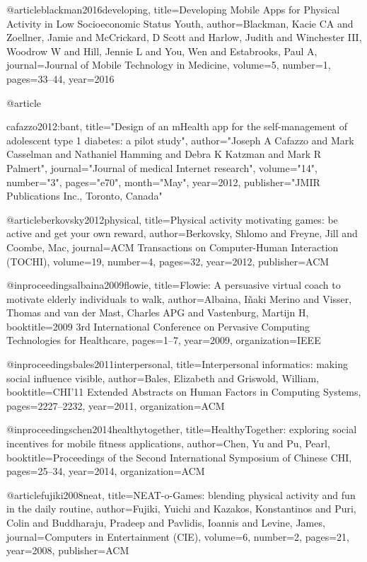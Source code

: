@article{blackman2016developing,
  title={Developing Mobile Apps for Physical Activity in Low Socioeconomic Status Youth},
  author={Blackman, Kacie CA and Zoellner, Jamie and McCrickard, D Scott and Harlow, Judith and Winchester III, Woodrow W and Hill, Jennie L and You, Wen and Estabrooks, Paul A},
  journal={Journal of Mobile Technology in Medicine},
  volume={5},
  number={1},
  pages={33--44},
  year={2016}
}


@article{cafazzo2012:bant,
  title="Design of an mHealth app for the self-management of adolescent type 1 diabetes: a pilot study",
  author="Joseph A Cafazzo and Mark Casselman and Nathaniel Hamming and Debra K Katzman  and Mark R Palmert",
  journal="Journal of medical Internet research",
  volume="14",
  number="3",
  pages="e70",
  month="May",
  year={2012},
  publisher="JMIR Publications Inc., Toronto, Canada"
  
}

@article{berkovsky2012physical,
  title={Physical activity motivating games: be active and get your own reward},
  author={Berkovsky, Shlomo and Freyne, Jill and Coombe, Mac},
  journal={ACM Transactions on Computer-Human Interaction (TOCHI)},
  volume={19},
  number={4},
  pages={32},
  year={2012},
  publisher={ACM}
}

@inproceedings{albaina2009flowie,
  title={Flowie: A persuasive virtual coach to motivate elderly individuals to walk},
  author={Albaina, I{\~n}aki Merino and Visser, Thomas and van der Mast, Charles APG and Vastenburg, Martijn H},
  booktitle={2009 3rd International Conference on Pervasive Computing Technologies for Healthcare},
  pages={1--7},
  year={2009},
  organization={IEEE}
}



@inproceedings{bales2011interpersonal,
  title={Interpersonal informatics: making social influence visible},
  author={Bales, Elizabeth and Griswold, William},
  booktitle={CHI'11 Extended Abstracts on Human Factors in Computing Systems},
  pages={2227--2232},
  year={2011},
  organization={ACM}
}

@inproceedings{chen2014healthytogether,
  title={HealthyTogether: exploring social incentives for mobile fitness applications},
  author={Chen, Yu and Pu, Pearl},
  booktitle={Proceedings of the Second International Symposium of Chinese CHI},
  pages={25--34},
  year={2014},
  organization={ACM}
}

@article{fujiki2008neat,
  title={NEAT-o-Games: blending physical activity and fun in the daily routine},
  author={Fujiki, Yuichi and Kazakos, Konstantinos and Puri, Colin and Buddharaju, Pradeep and Pavlidis, Ioannis and Levine, James},
  journal={Computers in Entertainment (CIE)},
  volume={6},
  number={2},
  pages={21},
  year={2008},
  publisher={ACM}
}



